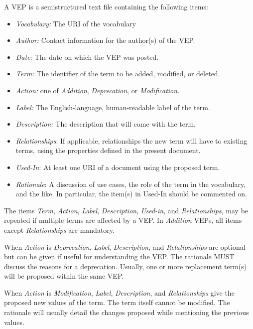 \documentclass[11pt,a4paper]{ivoa}
\newcommand{\vepitem}[1]{\emph{#1}}
\begin{document}
A VEP is a semistructured text file containing the following items:

\begin{itemize}
\item \vepitem{Vocabulary:} The URI of the vocabulary
\item \vepitem{Author:}  Contact information for the author(s) of
the VEP.
\item \vepitem{Date:} The date on which the VEP was posted.
\item \vepitem{Term:} The identifier of the term to be added, modified,
or deleted.
\item \vepitem{Action:} one of \textit{Addition}, \textit{Deprecation}, or
\textit{Modification}.
\item \vepitem{Label:} The English-language, human-readable label of the term.
\item \vepitem{Description:} The description that will come with the term.
\item \vepitem{Relationships}: If applicable, relationships the new
term will have to existing terms, using the properties defined in
the present document.
\item \vepitem{Used-In}: At least one URI of a document using the
proposed term.
\item \vepitem{Rationale}: A discussion of use cases, the role of the term in
the vocabulary, and the like.  In particular, the item(s) in Used-In
should be commented on.
\end{itemize}

The items \vepitem{Term}, \vepitem{Action}, \vepitem{Label},
\vepitem{Description}, \vepitem{Used-in}, 
and \vepitem{Relationships},  may be repeated if
multiple terms are affected by a VEP.  In \textit{Addition} VEPs, all items
except \vepitem{Relationships} are mandatory.

When \vepitem{Action} is \textit{Deprecation}, \vepitem{Label},
\vepitem{Description}, and \vepitem{Relationships} are optional but can be
given if useful for understanding the VEP.  The rationale MUST discuss
the reasons for a deprecation.  Usually, one or more replacement
term(s) will be proposed within the same VEP.

When \vepitem{Action} is \textit{Modification}, \vepitem{Label},
\vepitem{Description}, and \vepitem{Relationships} give the proposed new
values of the term.  The term itself cannot be modified.  The rationale
will usually detail the changes proposed while mentioning the previous 
values.
\end{document}
